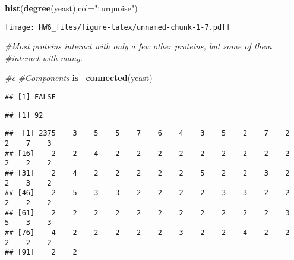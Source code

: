 \documentclass[
]{article}
\newenvironment{Shaded}{\begin{snugshade}}{\end{snugshade}}
\newcommand{\CommentTok}[1]{\textcolor[rgb]{0.56,0.35,0.01}{\textit{#1}}}
\newcommand{\DataTypeTok}[1]{\textcolor[rgb]{0.13,0.29,0.53}{#1}}
\newcommand{\KeywordTok}[1]{\textcolor[rgb]{0.13,0.29,0.53}{\textbf{#1}}}
\newcommand{\NormalTok}[1]{#1}
\newcommand{\OperatorTok}[1]{\textcolor[rgb]{0.81,0.36,0.00}{\textbf{#1}}}
\newcommand{\StringTok}[1]{\textcolor[rgb]{0.31,0.60,0.02}{#1}}
\begin{document}
\begin{Shaded}
\begin{Highlighting}[]
\KeywordTok{hist}\NormalTok{(}\KeywordTok{degree}\NormalTok{(yeast),}\DataTypeTok{col=}\StringTok{"turquoise"}\NormalTok{)}
\end{Highlighting}
\end{Shaded}

\texttt{[image: HW6\_files/figure-latex/unnamed-chunk-1-7.pdf]}

\begin{Shaded}
\begin{Highlighting}[]
\CommentTok{#Most proteins interact with only a few other proteins, but some of them}
\CommentTok{#interact with many.}

\CommentTok{#c}
\CommentTok{#Components}
\KeywordTok{is_connected}\NormalTok{(yeast)}
\end{Highlighting}
\end{Shaded}

\begin{verbatim}
## [1] FALSE
\end{verbatim}

\begin{Shaded}
\end{Shaded}

\begin{verbatim}
## [1] 92
\end{verbatim}

\begin{Shaded}
\end{Shaded}

\begin{verbatim}
##  [1] 2375    3    5    5    7    6    4    3    5    2    7    2    2    7    3
## [16]    2    2    4    2    2    2    2    2    2    2    2    2    2    2    2
## [31]    2    4    2    2    2    2    2    5    2    2    3    2    2    3    2
## [46]    2    5    3    3    2    2    2    2    3    3    2    2    2    2    2
## [61]    2    2    2    2    2    2    2    2    2    2    2    3    5    3    3
## [76]    4    2    2    2    2    2    3    2    2    4    2    2    2    2    2
## [91]    2    2
\end{verbatim}
\end{document}
